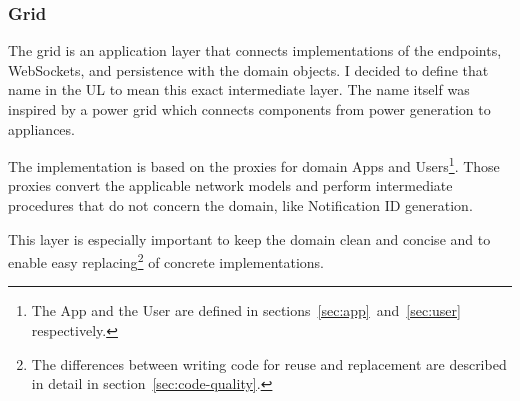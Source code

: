\subsubsection{Grid}\label{sec:grid}

The grid is an application layer
that connects implementations of
the endpoints, WebSockets, and persistence
with the domain objects.
I decided to define that name in the UL
to mean this exact intermediate layer.
The name itself was inspired by a power grid
which connects components
from power generation
to appliances.

The implementation is based on the proxies
for domain Apps and Users\footnote{
      The App and the User are defined in
      sections~\ref{sec:app}~and~\ref{sec:user}
      respectively.
}.
Those proxies convert the applicable network models
and perform intermediate procedures
that do not concern the domain,
like Notification ID generation.

This layer is especially important
to keep the domain clean and concise
and to enable easy replacing\footnote{
      The differences between writing code
      for reuse and replacement are described in detail
      in section~\ref{sec:code-quality}.
}
of concrete implementations.
